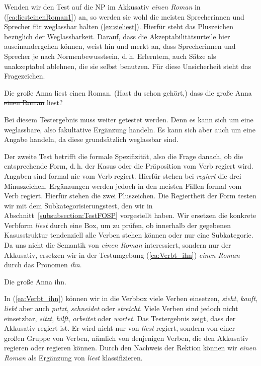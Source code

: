 \ea \label{ea:Obligatheit1}
\label{ea:liesteinenRoman} 
\label{ex:*liesteinenRoman}
\z 
\z 

Wenden wir den Test auf die NP im Akkusativ \textit{einen Roman} in (\ref{ea:liesteinenRoman1}) an, so werden sie wohl die meisten Sprecherinnen und Sprecher für weglassbar halten (\ref{ex:sieliest}). Hierfür steht das Pluszeichen bezüglich der Weglassbarkeit. Darauf, dass die Akzeptabilitätsurteile hier auseinandergehen können, weist \citet[14]{Heringer70} hin und merkt an, dass Sprecherinnen und Sprecher je nach Normenbewusstsein, d.\,h. Erlerntem, auch Sätze als unakzeptabel ablehnen, die sie selbst benutzen. Für diese Unsicherheit steht das Fragezeichen.

\ea \label{ea:Obligatheit2}
\ea Die große Anna liest einen Roman.\label{ea:liesteinenRoman1} 
\ex (Hast du schon gehört,) dass die große Anna \sout{einen Roman} liest?\label{ex:sieliest}
\z 
\z 

Bei diesem Testergebnis muss weiter getestet werden. Denn es kann sich um eine weglassbare, also fakultative Ergänzung handeln. Es kann sich aber auch um eine Angabe handeln, da diese grundsätzlich weglassbar sind. 

Der zweite Test betrifft die formale Spezifizität, also die Frage danach, ob die entsprechende Form, d.\,h. der Kasus oder die Präposition vom Verb regiert wird. Angaben sind formal nie vom Verb regiert. Hierfür stehen bei \textit{regiert} die drei Minuszeichen. Ergänzungen werden jedoch in den meisten Fällen formal vom Verb regiert. Hierfür stehen die zwei Pluszeichen. Die Regiertheit der Form testen wir mit dem Subkategorisierungstest, den wir in Abschnitt~\ref{subsubsection:TestFOSP} vorgestellt haben. Wir ersetzen die konkrete Verbform \textit{liest} durch eine Box, um zu prüfen, ob innerhalb der gegebenen Kasusstruktur tendenziell alle Verben stehen können oder nur eine Subkategorie. Da uns nicht die Semantik von \textit{einen Roman} interessiert, sondern nur der Akkusativ, ersetzen wir in der Testumgebung (\ref{ea:Verbt_ihn}) \textit{einen Roman} durch das Pronomen \textit{ihn}.

\ea \label{ea:Verbt_ihn} Die große Anna \fbox{\phantom{liest}} ihn.
\z 

In (\ref{ea:Verbt_ihn}) können wir in die Verbbox viele Verben einsetzen, \zB \textit{sieht}, \textit{kauft}, \textit{liebt} aber auch \textit{putzt}, \textit{schneidet} oder \textit{streicht}. Viele Verben sind jedoch nicht einsetzbar, \zB \textit{sitzt}, \textit{hilft}, \textit{arbeitet} oder \textit{wartet}. Das Testergebnis zeigt, dass der Akkusativ regiert ist. Er wird nicht nur von \textit{liest} regiert, sondern von einer großen Gruppe von Verben, nämlich von denjenigen Verben, die den Akkusativ regieren oder regieren können. Durch den Nachweis der Rektion können wir \textit{einen Roman} als Ergänzung von \textit{liest} klassifizieren. 

